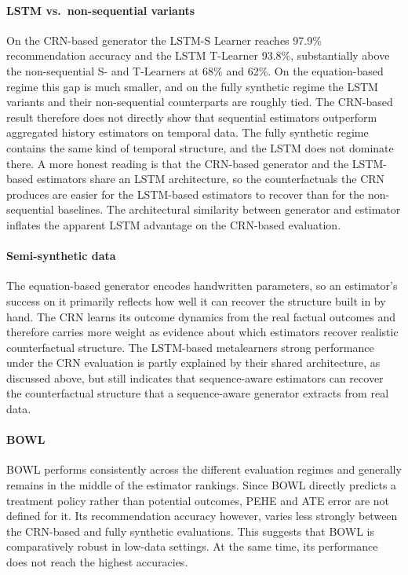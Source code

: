 \documentclass{article}
\begin{document}
\paragraph{LSTM vs.\ non-sequential variants}
On the CRN-based generator the LSTM-S Learner reaches 97.9\%
recommendation accuracy and the LSTM T-Learner 93.8\%, substantially
above the non-sequential S- and T-Learners at 68\% and 62\%. On the
equation-based regime this gap is much smaller, and on the fully
synthetic regime the LSTM variants and their non-sequential counterparts
are roughly tied. The CRN-based result therefore does not directly show that
sequential estimators outperform aggregated history estimators on
temporal data. The fully synthetic regime contains the same kind of
temporal structure, and the LSTM does not dominate there. A more
honest reading is that the CRN-based generator and the LSTM-based
estimators share an LSTM architecture, so the counterfactuals the CRN
produces are easier for the LSTM-based estimators to recover than for
the non-sequential baselines. The architectural similarity between
generator and estimator inflates the apparent LSTM advantage on the
CRN-based evaluation.

\paragraph{Semi-synthetic data}
The equation-based generator encodes handwritten parameters, so an
estimator's success on it primarily reflects how well it can recover
the structure built in by hand. The CRN learns its outcome dynamics
from the real factual outcomes and therefore carries more weight as
evidence about which estimators recover realistic counterfactual
structure. The LSTM-based metalearners strong performance under the
CRN evaluation is partly explained by their shared architecture,
as discussed above, but still indicates that sequence-aware estimators
can recover the counterfactual structure that a sequence-aware
generator extracts from real data.


\paragraph{BOWL}
BOWL performs consistently across the different evaluation regimes and
generally remains in the middle of the estimator rankings. Since BOWL
directly predicts a treatment policy rather than potential outcomes,
PEHE and ATE error are not defined for it. Its recommendation accuracy
however, varies less strongly between the CRN-based and fully synthetic
evaluations. This suggests that BOWL
is comparatively robust in low-data settings. At the same time, its performance
does not reach the highest accuracies.
\end{document}
